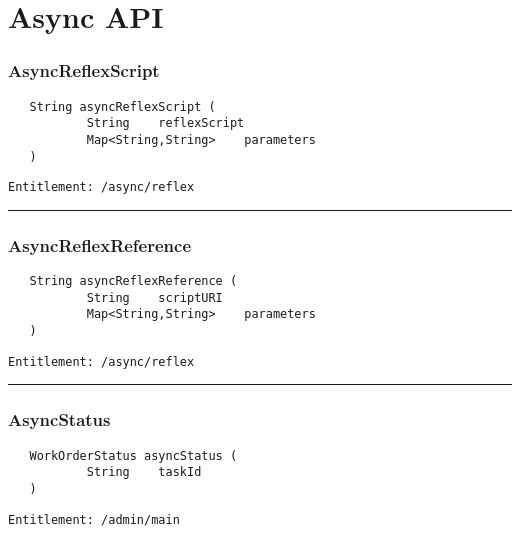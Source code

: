 \chapter{Async API}

\subsection{AsyncReflexScript}
\label{Api:AsyncReflexScript}
\begin{verbatim}
   String asyncReflexScript (
           String    reflexScript
           Map<String,String>    parameters
   )
\end{verbatim}
\begin{Verbatim}[fontsize=\small, formatcom=\color{Maroon}]
  Entitlement: /async/reflex
\end{Verbatim}



\rule{12cm}{2pt}
\subsection{AsyncReflexReference}
\label{Api:AsyncReflexReference}
\begin{verbatim}
   String asyncReflexReference (
           String    scriptURI
           Map<String,String>    parameters
   )
\end{verbatim}
\begin{Verbatim}[fontsize=\small, formatcom=\color{Maroon}]
  Entitlement: /async/reflex
\end{Verbatim}



\rule{12cm}{2pt}
\subsection{AsyncStatus}
\label{Api:AsyncStatus}
\begin{verbatim}
   WorkOrderStatus asyncStatus (
           String    taskId
   )
\end{verbatim}
\begin{Verbatim}[fontsize=\small, formatcom=\color{Maroon}]
  Entitlement: /admin/main
\end{Verbatim}



